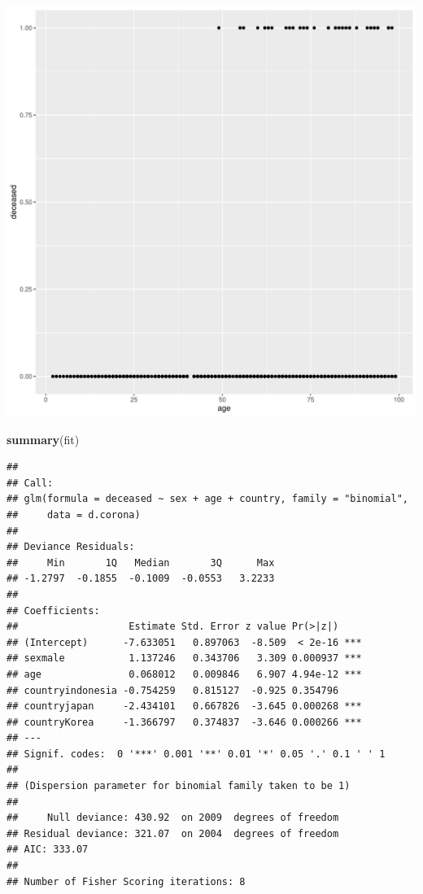 \documentclass[
]{article}
\newenvironment{Shaded}{\begin{snugshade}}{\end{snugshade}}
\newcommand{\KeywordTok}[1]{\textcolor[rgb]{0.13,0.29,0.53}{\textbf{#1}}}
\newcommand{\NormalTok}[1]{#1}
\begin{document}
\includegraphics{Eksamensbesvarelse_files/figure-latex/unnamed-chunk-8-1.pdf}

\begin{Shaded}
\begin{Highlighting}[]
\KeywordTok{summary}\NormalTok{(fit)}
\end{Highlighting}
\end{Shaded}

\begin{verbatim}
## 
## Call:
## glm(formula = deceased ~ sex + age + country, family = "binomial", 
##     data = d.corona)
## 
## Deviance Residuals: 
##     Min       1Q   Median       3Q      Max  
## -1.2797  -0.1855  -0.1009  -0.0553   3.2233  
## 
## Coefficients:
##                   Estimate Std. Error z value Pr(>|z|)    
## (Intercept)      -7.633051   0.897063  -8.509  < 2e-16 ***
## sexmale           1.137246   0.343706   3.309 0.000937 ***
## age               0.068012   0.009846   6.907 4.94e-12 ***
## countryindonesia -0.754259   0.815127  -0.925 0.354796    
## countryjapan     -2.434101   0.667826  -3.645 0.000268 ***
## countryKorea     -1.366797   0.374837  -3.646 0.000266 ***
## ---
## Signif. codes:  0 '***' 0.001 '**' 0.01 '*' 0.05 '.' 0.1 ' ' 1
## 
## (Dispersion parameter for binomial family taken to be 1)
## 
##     Null deviance: 430.92  on 2009  degrees of freedom
## Residual deviance: 321.07  on 2004  degrees of freedom
## AIC: 333.07
## 
## Number of Fisher Scoring iterations: 8
\end{verbatim}
\end{document}
